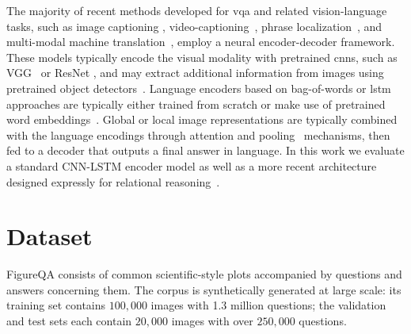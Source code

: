 \documentclass{article} \usepackage{iclr2018_workshop,times}
\begin{document}
The majority of recent methods developed for \gls{vqa} and related vision-language tasks, such as image captioning 
\citep{xu2015show, fang2015captions}, video-captioning~\citep{yu2016video}, phrase localization~\citep{hu2016natural}, 
and multi-modal machine translation~\citep{elliott2017imagination}, employ a neural
encoder-decoder framework. These models typically encode the visual modality with 
pretrained \glspl{cnn}, such as VGG~\citep{simonyan2014very} or ResNet
\citep{he2016deep}, and may extract additional information from images 
using pretrained object detectors~\citep{ren15fasterrcnn}. Language encoders
based on bag-of-words or \gls{lstm} approaches are typically either trained from scratch
\citep{elliott2017imagination} or make use of pretrained word embeddings~\citep{you2016image}.
Global or local image representations are typically combined with the language encodings through attention
\citep{xiong2016dynamic, yang2016stacked, lu2016hierarchical} and pooling~\citep{fukui2016multimodal} mechanisms,
then fed to a decoder that outputs a final answer in language.
In this work we evaluate a standard CNN-LSTM encoder model as well as a more recent architecture designed expressly for relational reasoning~\citep{santoro2017simple}.

\section{Dataset}
\label{sec:dataset}
FigureQA consists of common scientific-style plots accompanied by questions and answers concerning them. The corpus is synthetically generated at large scale: its training set contains $100,000$ images with 1.3 million questions; the validation and test sets each contain $20,000$ images with over $250,000$ questions.
\end{document}
